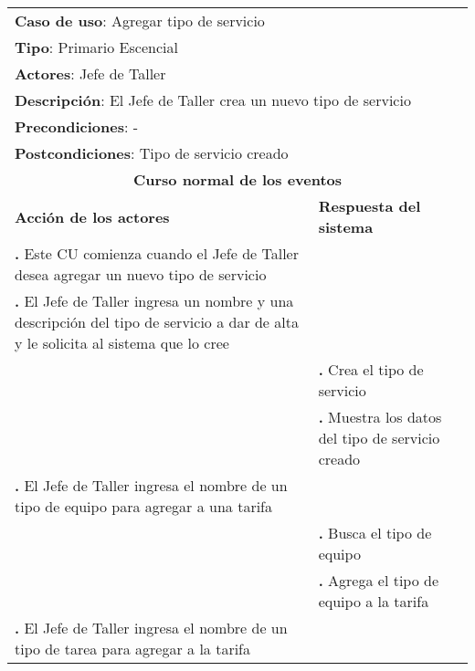 \documentclass[12pt]{extarticle}
\begin{document}
    \newcommand\inc{\stepcounter{step}\textbf{\thestep. }}
    \newcommand\resetinc{\setcounter{step}{0}}
    \newcommand\raya{\noindent\rule{169mm}{0.8mm}\\}


	\begin{longtable}{ |p{8cm}|p{8cm}| }
		\hline
		\multicolumn{2}{|p{16cm}|}{\textbf{Caso de uso}: Agregar tipo de servicio}\\
		\multicolumn{2}{|p{16cm}|}{\textbf{Tipo}: Primario Escencial}\\
		\multicolumn{2}{|p{16cm}|}{\textbf{Actores}: Jefe de Taller}\\
		\multicolumn{2}{|p{16cm}|}{\textbf{Descripción}: El Jefe de Taller crea un nuevo tipo de servicio}\\
		\multicolumn{2}{|p{16cm}|}{\textbf{Precondiciones}: -}\\
		\multicolumn{2}{|p{16cm}|}{\textbf{Postcondiciones}: Tipo de servicio creado}\\
		\hline
		\multicolumn{2}{|c|}{\textbf{Curso normal de los eventos}}\\
		\hline
		\textbf{Acción de los actores} & \textbf{Respuesta del sistema}\\
		\hline
			\inc Este CU comienza cuando el Jefe de Taller desea agregar un nuevo tipo de servicio & \\
			\hline
            \inc  El Jefe de Taller ingresa un nombre y una descripción del tipo de servicio a dar de alta y le solicita al sistema que lo cree & \\
			\hline
			& \inc Crea el tipo de servicio \\
			\hline
            & \inc Muestra los datos del tipo de servicio creado\\
			\hline


			\inc El Jefe de Taller ingresa el nombre de un tipo de equipo para agregar a una tarifa& \\
			\hline
			& \inc Busca el tipo de equipo \\
			\hline
            & \inc Agrega el tipo de equipo a la tarifa \\
			\hline
            \inc El Jefe de Taller ingresa el nombre de un tipo de tarea para agregar a la tarifa&\\
			\hline



\end{longtable}
\end{document}
